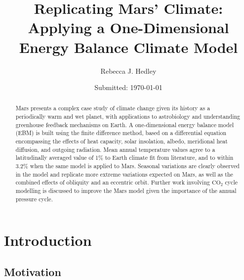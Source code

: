 \documentclass[12pt,onecolumn]{revtex4-2}    %
\begin{document}
\title{Replicating Mars' Climate: Applying a One-Dimensional Energy Balance Climate Model} 
\date{Submitted: \today{}}
\author{Rebecca J. Hedley}


\begin{abstract}              

Mars presents a complex case study of climate change given its history as a periodically warm and wet planet, with applications to astrobiology and understanding greenhouse feedback mechanisms on Earth. A one-dimensional energy balance model (EBM) is built using the finite difference method, based on a differential equation encompassing the effects of heat capacity, solar insolation, albedo, meridional heat diffusion, and outgoing radiation. Mean annual temperature values agree to a latitudinally averaged value of 1\% to Earth climate fit from literature, and to within 3.2\% when the same model is applied to Mars. Seasonal variations are clearly observed in the model and replicate more extreme variations expected on Mars, as well as the combined effects of obliquity and an eccentric orbit. Further work involving $\mathrm{CO_2}$ cycle modelling is discussed to improve the Mars model given the importance of the annual pressure cycle.

\end{abstract}

\maketitle

\thispagestyle{plain} %

\tableofcontents

\section{Introduction} 

\subsection{Motivation}
\end{document}
